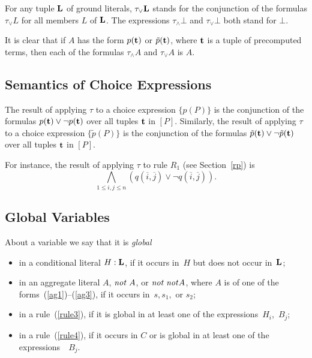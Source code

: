\documentclass{tlp}
\def\ar{\leftarrow}
\def\beq{\begin{equation}}
\def\eeq#1{\label{#1}\end{equation}}
\def\i#1{\hbox{\it #1\/}}
\def\no{{\it not}}
\begin{document}
For any tuple ${\bf L}$ of ground literals, 
$\tau_{\lor}{\bf L}$ stands for the conjunction of the formulas
$\tau_{\lor}L$ for all 
members $L$ of ${\bf L}$. The expressions $\tau_{\land}\bot$ and 
$\tau_{\lor}\bot$ both stand for $\bot$. 

It is clear that if $A$ has the form $p({\bf t})$ or $\tilde{p}({\bf t})$,
where ${\bf t}$ is a tuple of precomputed terms, then each of the 
formulas $\tau_{\land} A$ and $\tau_{\lor} A$ is $A$. 
 
\subsection{Semantics of Choice Expressions}

The result of applying $\tau$ to a choice expression $\{p(P)\}$ is the 
conjunction of the formulas
$p({\bf t}) \lor \neg p({\bf t})$ over all tuples ${\bf t}$ in $[P]$. 
Similarly, the result of applying $\tau$ to a choice expression $\{\tilde{p}(P)\}$ 
is the conjunction of the formulas $\tilde{p}({\bf t}) \lor \neg \tilde{p}({\bf t})$
over all tuples ${\bf t}$ in $[P]$.

For instance, the result of applying $\tau$ to rule $R_1$ (see
Section~\ref{rp}) is
\beq
\bigwedge_{1 \leq i,j \leq n} \left ( q(\overline i, \overline j) \lor \neg q(\overline i, \overline j) 
\right ).
\eeq{tauR_1}

\subsection{Global Variables}\label{sem:global}

About a variable we say that it is {\sl global}
\begin{itemize}
\item
in a conditional literal $H : {\bf L}$, if it occurs in~$H$ but does not
occur in~${\bf L}$;
\item
in an aggregate literal $A$, $\no \; A$, or $\no \; \no A$, where $A$ is of one of 
the forms~(\ref{ag1})--(\ref{ag3}), if it occurs in~$s, s_1,$ or $s_2$;
\item
in a rule~(\ref{rule3}), if it is global in at least one of the
expressions~$H_i$,~$B_j$;
\item
in a rule~(\ref{rule4}), if it occurs in $C$ or is global in at least one of 
the expressions~~$B_j$.
\end{itemize}
\end{document}

